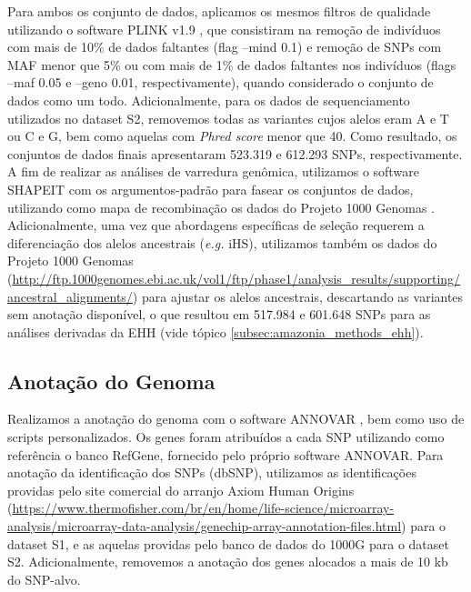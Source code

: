 Para ambos os conjunto de dados, aplicamos os mesmos filtros de qualidade utilizando o software PLINK v1.9 \cite{chang_second-generation_2015}, que consistiram na remoção de indivíduos com mais de 10\% de dados faltantes (flag --mind 0.1) e remoção de SNPs com MAF menor que 5\% ou com mais de 1\% de dados faltantes nos indivíduos (flags --maf 0.05 e --geno 0.01, respectivamente), quando considerado o conjunto de dados como um todo. Adicionalmente, para os dados de sequenciamento utilizados no dataset S2, removemos todas as variantes cujos alelos eram A e T ou C e G, bem como aquelas com \textit{Phred score} menor que 40. Como resultado, os conjuntos de dados finais apresentaram 523.319 e 612.293 SNPs, respectivamente. 
A fim de realizar as análises de varredura genômica, utilizamos o software SHAPEIT \cite{delaneau_linear_2012} com os argumentos-padrão para fasear os conjuntos de dados, utilizando como mapa de recombinação os dados do Projeto 1000 Genomas \cite{1000_genomes_project_consortium_global_2015}. Adicionalmente, uma vez que abordagens específicas de seleção requerem a diferenciação dos alelos ancestrais (\emph{e.g.} iHS), utilizamos também os dados do Projeto 1000 Genomas (\url{http://ftp.1000genomes.ebi.ac.uk/vol1/ftp/phase1/analysis_results/supporting/ancestral_alignments/}) para ajustar os alelos ancestrais, descartando as variantes sem anotação disponível, o que resultou em 517.984 e 601.648 SNPs para as análises derivadas da EHH (vide tópico \ref{subsec:amazonia_methods_ehh}).

\vspace{\onelineskip}



\vspace{\onelineskip}





\FloatBarrier



\FloatBarrier

\subsection{Anotação do Genoma}

Realizamos a anotação do genoma com o software ANNOVAR \cite{wang_annovar_2010}, bem como uso de scripts personalizados. Os genes foram atribuídos a cada SNP utilizando como referência o banco RefGene, fornecido pelo próprio software ANNOVAR.  Para anotação da identificação dos SNPs (dbSNP), utilizamos as identificações providas pelo site comercial do arranjo Axiom Human Origins (\url{https://www.thermofisher.com/br/en/home/life-science/microarray-analysis/microarray-data-analysis/genechip-array-annotation-files.html}) para o  dataset S1, e as aquelas providas pelo banco de dados do 1000G para o dataset S2. Adicionalmente, removemos a anotação dos genes alocados a mais de 10 kb do SNP-alvo.

